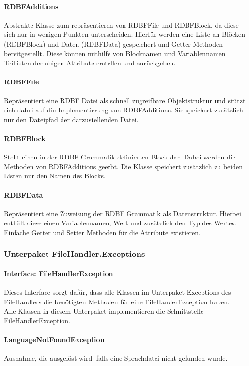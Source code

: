\documentclass[parskip=full]{scrartcl}
\begin{document}
\paragraph{RDBFAdditions}
Abstrakte Klasse zum repräsentieren von RDBFFile und RDBFBlock, da diese sich nur in wenigen Punkten unterscheiden.
Hierfür werden eine Liste an Blöcken (RDBFBlock) und Daten (RDBFData) gespeichert und Getter-Methoden bereitgestellt.
Diese können mithilfe von Blocknamen und Variablennamen Teillisten der obigen Attribute erstellen und zurückgeben.
\paragraph{RDBFFile}
Repräsentiert eine RDBF Datei als schnell zugreifbare Objektstruktur und stützt sich dabei auf die Implementierung von RDBFAdditions.
Sie speichert zusätzlich nur den Dateipfad der darzustellenden Datei.
\paragraph{RDBFBlock}
Stellt einen in der RDBF Grammatik definierten Block dar. Dabei werden die Methoden von RDBFAdditions geerbt.
Die Klasse speichert zusätzlich zu beiden Listen nur den Namen des Blocks.
\paragraph{RDBFData}
Repräsentiert eine Zuweisung der RDBF Grammatik als Datenstruktur. Hierbei enthält diese einen Variablennamen, Wert und zusätzlich den Typ des Wertes.
Einfache Getter und Setter Methoden für die Attribute existieren.
\subsubsection{Unterpaket FileHandler.Exceptions}
\paragraph{Interface: FileHandlerException}
Dieses Interface sorgt dafür, dass alle Klassen im Unterpaket Exceptions des FileHandlers die benötigten Methoden für eine FileHanderException haben.
\\
Alle Klassen in diesem Unterpaket implementieren die Schnittstelle FileHandlerException.
\paragraph{LanguageNotFoundException}
Ausnahme, die ausgelöst wird, falls eine Sprachdatei nicht gefunden wurde.
\end{document}
